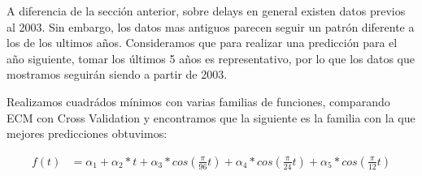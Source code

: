 A diferencia de la sección anterior, sobre delays en general existen datos previos al 2003. Sin embargo, los datos mas antiguos parecen seguir un patrón diferente a los de los ultimos años. Consideramos que para realizar una predicción para el año siguiente, tomar los últimos 5 años es representativo, por lo que los datos que mostramos seguirán siendo a partir de 2003. \\


Realizamos cuadrádos mínimos con varias familias de funciones, comparando ECM con Cross Validation y encontramos que la siguiente es la familia con la que mejores predicciones obtuvimos:

\begin{align}
f(t) &= \alpha_1 + \alpha_2 * t + \alpha_3 * cos(\frac{\pi}{96} t) + \alpha_4 * cos(\frac{\pi}{24} t) + \alpha_5 * cos(\frac{\pi}{12} t)
\end{align}


